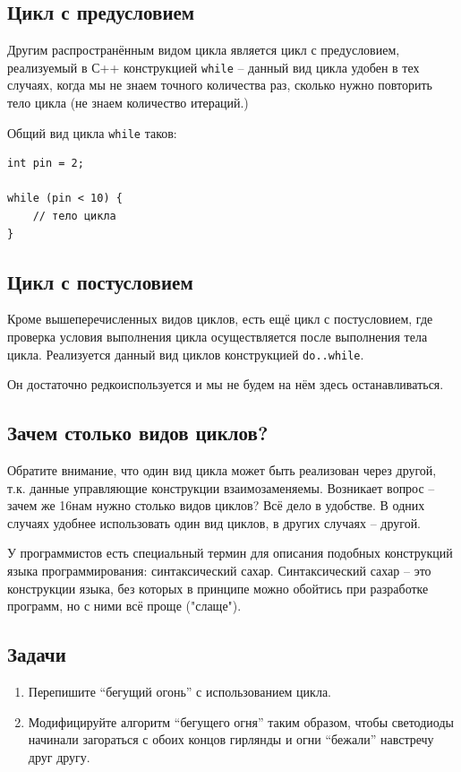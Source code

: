 \documentclass[a4paper,twoside]{book}
\begin{document}
\subsection{Цикл с предусловием}

Другим распространённым видом цикла является цикл с предусловием, реализуемый в
С++ конструкцией \texttt{while} -- данный вид цикла удобен в тех случаях, когда
мы не знаем точного количества раз, сколько нужно повторить тело цикла (не знаем
количество итераций.)

Общий вид цикла \texttt{while} таков:
\begin{verbatim}
int pin = 2;

while (pin < 10) {
    // тело цикла
}
\end{verbatim}

\subsection{Цикл с постусловием}

Кроме вышеперечисленных видов циклов, есть ещё цикл с постусловием, где
проверка условия выполнения цикла осуществляется после выполнения тела цикла.
Реализуется данный вид циклов конструкцией \texttt{do..while}.

Он достаточно редкоиспользуется и мы не будем на нём здесь останавливаться.

\subsection{Зачем столько видов циклов?}

Обратите внимание, что один вид цикла может быть реализован через другой, т.к.
данные управляющие конструкции взаимозаменяемы. Возникает вопрос -- зачем же
16нам нужно столько видов циклов? Всё дело в удобстве. В одних случаях удобнее
использовать один вид циклов, в других случаях -- другой.

У программистов есть специальный термин для описания подобных конструкций языка
программирования: синтаксический сахар. Синтаксический сахар -- это конструкции
языка, без которых в принципе можно обойтись при разработке программ, но с ними
всё проще ("слаще").

\subsection{Задачи}
\begin{enumerate}
\item Перепишите ``бегущий огонь'' с использованием цикла.
\item Модифицируйте алгоритм ``бегущего огня'' таким образом, чтобы светодиоды
  начинали загораться с обоих концов гирлянды и огни ``бежали'' навстречу друг
  другу.
\end{enumerate}
\end{document}
